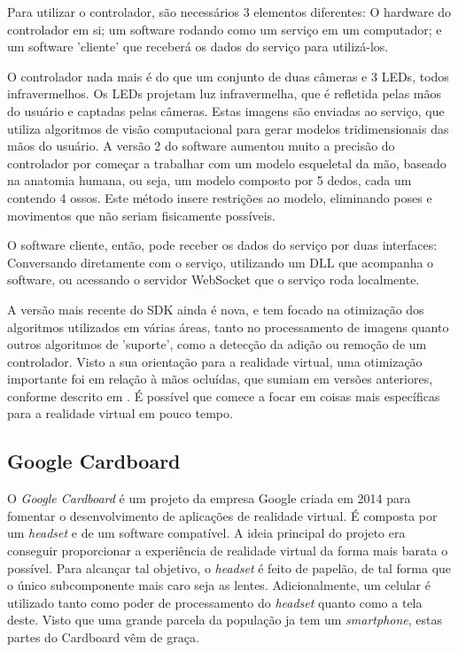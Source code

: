 Para utilizar o controlador, são necessários 3 elementos diferentes: O hardware do controlador em si; um software rodando como um serviço em um computador; e um software 'cliente' que receberá os dados do serviço para utilizá-los.

O controlador nada mais é do que um conjunto de duas câmeras e 3 LEDs, todos infravermelhos. Os LEDs projetam luz infravermelha, que é refletida pelas mãos do usuário e captadas pelas câmeras. Estas imagens são enviadas ao serviço, que utiliza algoritmos de visão computacional para gerar modelos tridimensionais das mãos do usuário. A versão 2 do software aumentou muito a precisão do controlador por começar a trabalhar com um modelo esqueletal da mão, baseado na anatomia humana, ou seja, um modelo composto por 5 dedos, cada um contendo 4 ossos. Este método insere restrições ao modelo, eliminando poses e movimentos que não seriam fisicamente possíveis.

O software cliente, então, pode receber os dados do serviço por duas interfaces: Conversando diretamente com o serviço, utilizando um DLL que acompanha o software, ou acessando o servidor WebSocket que o serviço roda localmente.

A versão mais recente do SDK ainda é nova, e tem focado na otimização dos algoritmos utilizados em várias áreas, tanto no processamento de imagens quanto outros algoritmos de 'suporte', como a detecção da adição ou remoção de um controlador. Visto a sua orientação para a realidade virtual, uma otimização importante foi em relação à mãos ocluídas, que sumiam em versões anteriores, conforme descrito em \cite{leap:2016:changeset}. É possível que comece a focar em coisas mais específicas para a realidade virtual em pouco tempo.


\subsection{Google Cardboard}\label{subsec-teo-google-cardboard}

O \textit{Google Cardboard} é um projeto da empresa Google criada em 2014 para fomentar o desenvolvimento de aplicações de realidade virtual. É composta por um \textit{headset} e de um software compatível. A ideia principal do projeto era conseguir proporcionar a experiência de realidade virtual da forma mais barata o possível. Para alcançar tal objetivo, o \textit{headset} é feito de papelão, de tal forma que o único subcomponente mais caro seja as lentes. Adicionalmente, um celular é utilizado tanto como poder de processamento do \textit{headset} quanto como a tela deste. Visto que uma grande parcela da população ja tem um \textit{smartphone}, estas partes do Cardboard vêm de graça.

